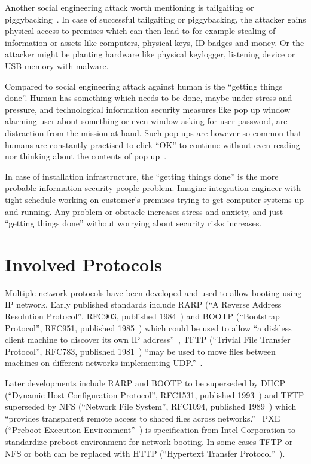 Another social engineering attack worth mentioning is tailgaiting or
piggybacking~\cite{fairbrother2014insider}. In case of successful
tailgaiting or piggybacking, the attacker gains physical access to
premises which can then lead to for example stealing of information or
assets like computers, physical keys, ID badges and money. Or the
attacker might be planting hardware like physical keylogger, listening
device or USB memory with malware.

Compared to social engineering attack against human is the ``getting
things done''. Human has something which needs to be done, maybe under
stress and pressure, and technological information security measures
like pop up window alarming user about something or even window asking
for user password, are distraction from the mission at hand. Such pop
ups are however so common that humans are constantly practised to
click ``OK'' to continue without even reading nor thinking about the
contents of pop up~\cite{anderson}.

In case of installation infrastructure, the ``getting things done'' is
the more probable information security people problem. Imagine
integration engineer with tight schedule working on customer's
premises trying to get computer systems up and running. Any problem or
obstacle increases stress and anxiety, and just ``getting things
done'' without worrying about security risks increases.


\section{Involved Protocols}

Multiple network protocols have been developed and used to allow
booting using IP network. Early published standards include RARP (``A
Reverse Address Resolution Protocol'', RFC903, published
1984~\cite{RFC903}) and BOOTP (``Bootstrap Protocol'', RFC951,
published 1985~\cite{RFC951}) which could be used to allow ``a
diskless client machine to discover its own IP
address''~\cite{RFC951}, TFTP (``Trivial File Transfer Protocol'',
RFC783, published 1981~\cite{RFC783}) ``may be used to move files
between machines on different networks implementing
UDP.''~\cite{RFC783}.

Later developments include RARP and BOOTP to be superseded by DHCP
(``Dynamic Host Configuration Protocol'', RFC1531, published
1993~\cite{RFC1531}) and TFTP superseded by NFS (``Network File
System'', RFC1094, published 1989~\cite{RFC1094}) which ``provides
transparent remote access to shared files across
networks.''~\cite{RFC1094} PXE (``Preboot Execution
Environment''~\cite{PXEspec}) is specification from Intel Corporation
to standardize preboot environment for network booting. In some cases
TFTP or NFS or both can be replaced with HTTP (``Hypertext Transfer
Protocol''~\cite{RFC1945}\cite{RFC2616}).


